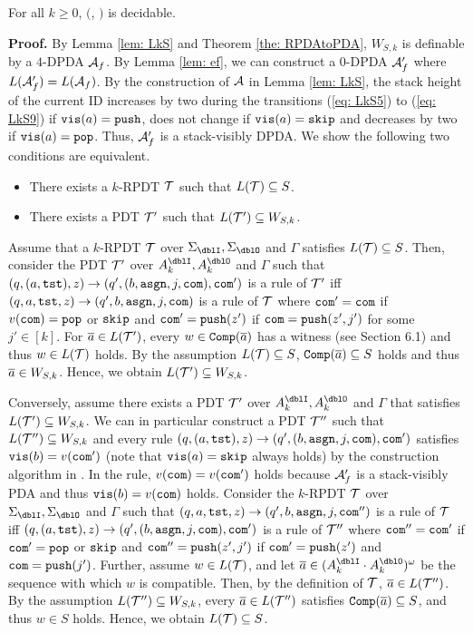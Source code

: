 \begin{theorem}
\label{th: DPDAv}
For all $k\geq 0$, \Real $($\DRPDAv, \RPDTk$)$ is decidable.
\end{theorem}
{\bf Proof.}\quad
By Lemma \ref{lem: LkS} and Theorem \ref{the: RPDAtoPDA},
$W_{S,k}$ is definable by a $4$-DPDA ${\cal A}_f$.
By Lemma \ref{lem: ef}, we can construct a $0$-DPDA ${\cal A}'_f$
where $L({\cal A}_f')=L({\cal A}_f)$.
By the construction of ${\cal A}$ in Lemma \ref{lem: LkS},
the stack height of the current ID increases by two during the transitions
(\ref{eq: LkS5}) to (\ref{eq: LkS9}) if $\mathtt{vis}(a)=\mathtt{push}$,
does not change if $\mathtt{vis}(a)=\mathtt{skip}$ and
decreases by two if $\mathtt{vis}(a)=\mathtt{pop}$.
Thus, ${\cal A}'_f$ is a stack-visibly DPDA.
We show the following two conditions are equivalent.
\begin{itemize}
\item There exists a $k$-RPDT ${\cal T}$ such that $L({\cal T})\subseteq S$.
\item There exists a PDT ${\cal T}'$ such that $L({\cal T}')\subseteq W_{S,k}$.
\end{itemize}
Assume that a $k$-RPDT ${\cal T}$ over $\Sigma_\dblI,\Sigma_\dblO$ and $\Gamma$ satisfies $L({\cal T})\subseteq S$.
Then, consider the PDT ${\cal T}'$ over $A_k^\dblI,A_k^\dblO$ and $\Gamma$ such that
$(q,(a,\mathtt{tst}),z)\to(q',(b,\mathtt{asgn},j,\mathtt{com}),\mathtt{com}')$ is a rule of ${\cal T}'$
iff $(q,a,\mathtt{tst},z)\to(q',b,\mathtt{asgn},j,\mathtt{com})$ is a rule of ${\cal T}$ where $\mathtt{com}'=\mathtt{com}$ if $v(\mathtt{com})=\mathtt{pop}$ or $\mathtt{skip}$ and $\mathtt{com}'=\mathtt{push}(z')$ if $\mathtt{com}=\mathtt{push}(z',j')$ for some $j'\in[k]$.
For ${\overline{a}}\in L({\cal T}')$, every $w\in{\mathtt{Comp}}({\overline{a}})$
has a witness (see Section 6.1) and thus $w\in L({\cal T})$ holds.
By the assumption $L({\cal T})\subseteq S$,
${\mathtt{Comp}}({\overline{a}})\subseteq S$ holds and thus ${\overline{a}}\in W_{S,k}$.
Hence, we obtain $L({\cal T}')\subseteq W_{S,k}$.

Conversely, assume there exists a PDT ${\cal T}'$ over $A_k^\dblI,A_k^\dblO$ and $\Gamma$ that
satisfies $L({\cal T}')\subseteq W_{S,k}$.
We can in particular construct a PDT ${\cal T}''$ such that
$L({\cal T}'')\subseteq W_{S,k}$ and
every rule $(q,(a,\mathtt{tst}),z)\to(q',(b,\mathtt{asgn},j,\mathtt{com}),\mathtt{com}')$
satisfies $\mathtt{vis}(b)=v(\mathtt{com}')$
(note that $\mathtt{vis}(a)=\mathtt{skip}$ always holds)
by the construction algorithm in \cite{Wa96}.
In the rule, $v(\mathtt{com})=v(\mathtt{com}')$ holds because ${\cal A}'_f$ is a stack-visibly PDA and thus $\mathtt{vis}(b)=v(\mathtt{com})$ holds.
Consider the $k$-RPDT ${\cal T}$ over $\Sigma_\dblI,\Sigma_\dblO$ and $\Gamma$
such that
$(q,a,\mathtt{tst},z)\to(q',b,\mathtt{asgn},j,\mathtt{com}'')$ is a rule of ${\cal T}$
iff $(q,(a,\mathtt{tst}),z)\to(q',(b,\mathtt{asgn},j,\mathtt{com}),\mathtt{com}')$ is a rule of ${\cal T}''$
where $\mathtt{com}''=\mathtt{com}'$ if $\mathtt{com}'=\mathtt{pop}$ or $\mathtt{skip}$ and
$\mathtt{com}''=\mathtt{push}(z',j')$ if $\mathtt{com}'=\mathtt{push}(z')$ and $\mathtt{com}=\mathtt{push}(j')$.
Further, assume $w\in L({\cal T})$, and let
$\overa\in (A_k^\dblI\cdot A_k^\dblO)^\omega$
be the sequence with which $w$ is compatible.
Then, by the definition of ${\cal T}$,
${\overline{a}}\in L({\cal T}'')$.
By the assumption $L({\cal T}'')\subseteq W_{S,k}$,
every ${\overline{a}}\in L({\cal T}'')$
satisfies ${\mathtt{Comp}}({\overline{a}})\subseteq S$, and thus $w\in S$ holds.
Hence, we obtain $L({\cal T})\subseteq S$.

